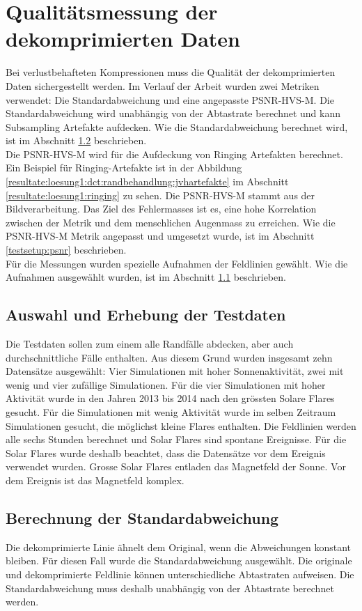 \section{Qualitätsmessung der dekomprimierten Daten} \label{testsetup}
Bei verlustbehafteten Kompressionen muss die Qualität der dekomprimierten Daten sichergestellt werden. Im Verlauf der Arbeit wurden zwei Metriken verwendet: Die Standardabweichung und eine angepasste PSNR-HVS-M. Die Standardabweichung wird unabhängig von der Abtastrate berechnet und kann Subsampling Artefakte aufdecken. Wie die Standardabweichung berechnet wird, ist im Abschnitt \ref{testsetup:ablauf} beschrieben.\\
Die PSNR-HVS-M wird für die Aufdeckung von Ringing Artefakten \cite{wiki:ringing:artefacts} berechnet. Ein Beispiel für Ringing-Artefakte ist in der Abbildung \ref{resultate:loesung1:dct:randbehandlung:jvhartefakte} im Abschnitt \ref{resultate:loesung1:ringing} zu sehen. Die PSNR-HVS-M stammt aus der Bildverarbeitung. Das Ziel des Fehlermasses ist es, eine hohe Korrelation zwischen der Metrik und dem menschlichen Augenmass zu erreichen. Wie die PSNR-HVS-M Metrik angepasst und umgesetzt wurde, ist im Abschnitt \ref{testsetup:psnr} beschrieben.\\
Für die Messungen wurden spezielle Aufnahmen der Feldlinien gewählt. Wie die Aufnahmen ausgewählt wurden, ist im Abschnitt \ref{testsetup:auswahl_erhebung} beschrieben.

\subsection{Auswahl und Erhebung der Testdaten}\label{testsetup:auswahl_erhebung}
Die Testdaten sollen zum einem alle Randfälle abdecken, aber auch durchschnittliche Fälle enthalten. Aus diesem Grund wurden insgesamt zehn Datensätze ausgewählt: Vier Simulationen mit hoher Sonnenaktivität, zwei mit wenig und vier zufällige Simulationen. Für die vier Simulationen mit hoher Aktivität wurde in den Jahren 2013 bis 2014 nach den grössten Solare Flares gesucht. Für die Simulationen mit wenig Aktivität wurde im selben Zeitraum Simulationen gesucht, die möglichst kleine Flares enthalten.
Die Feldlinien werden alle sechs Stunden berechnet und Solar Flares sind spontane Ereignisse. Für die Solar Flares wurde deshalb beachtet, dass die Datensätze vor dem Ereignis verwendet wurden. Grosse Solar Flares entladen das Magnetfeld der Sonne. Vor dem Ereignis ist das Magnetfeld komplex.

\subsection{Berechnung der Standardabweichung}\label{testsetup:ablauf}
Die dekomprimierte Linie ähnelt dem Original, wenn die Abweichungen konstant bleiben. Für diesen Fall wurde die Standardabweichung ausgewählt. Die originale und dekomprimierte Feldlinie können unterschiedliche Abtastraten aufweisen. Die Standardabweichung muss deshalb unabhängig von der Abtastrate berechnet werden.

